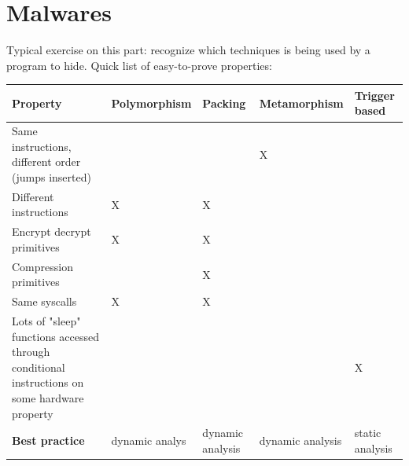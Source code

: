 \documentclass{article}
\begin{document}
		\section{Malwares}
			Typical exercise on this part: recognize which techniques is being used by a program to hide. Quick list of easy-to-prove properties:
			\begin{center}
				\begin{tabular}{ | m{10em} || m{6em} | m{4em} | m{6em} | m{6em} |}
					\hline
					Property & Polymorphism & Packing & Metamorphism & Trigger based \\
					\hline
					\hline
					Same instructions, different order (jumps inserted) & & & X & \\
					\hline
					Different instructions & X & X & & \\
					\hline
					Encrypt decrypt primitives & X & X & & \\
					\hline
					Compression primitives & & X & & \\
					\hline
					Same syscalls & X & X & & \\
					\hline
					Lots of "sleep" functions accessed through conditional instructions on some hardware property & & & & X \\
					\hline
					\textbf{Best practice} & dynamic analys & dynamic analysis  & dynamic analysis & static analysis \\
					\hline
				\end{tabular}
			\end{center}
				
				
\end{document}
